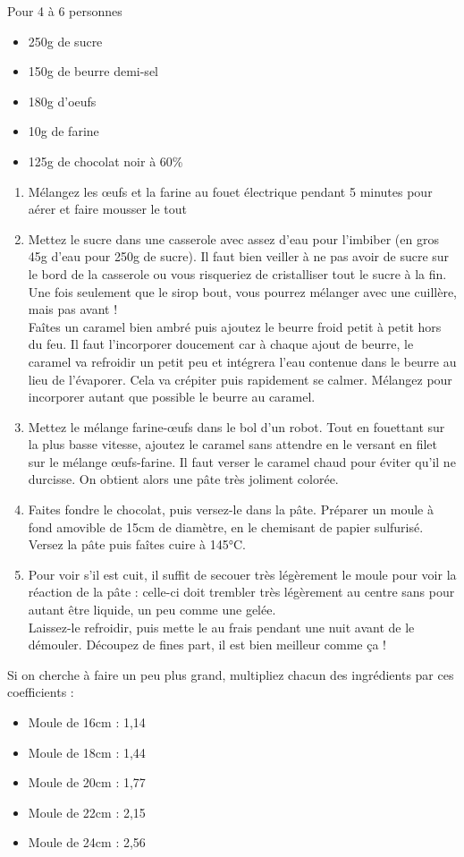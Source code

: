 {Pour 4 à 6 personnes}{\begin{itemize}
	\item 250g de sucre
	\item 150g de beurre demi-sel
	\item 180g d'oeufs
	\item 10g de farine
	\item 125g de chocolat noir à 60\%
\end{itemize}}
{\begin{enumerate}
\item Mélangez les \oe ufs et la farine au fouet électrique pendant 5 minutes pour aérer et faire mousser le tout
\item Mettez le sucre dans une casserole avec assez d'eau pour l'imbiber (en gros 45g d'eau pour 250g de sucre). Il faut bien veiller à ne pas avoir de sucre sur le bord de la casserole ou vous risqueriez de cristalliser tout le sucre à la fin. Une fois seulement que le sirop bout, vous pourrez mélanger avec une cuillère, mais pas avant !\\
Faîtes un caramel bien ambré puis ajoutez le beurre froid petit à petit hors du feu. Il faut l'incorporer doucement car à chaque ajout de beurre, le caramel va refroidir un petit peu et intégrera l'eau contenue dans le beurre au lieu de l'évaporer. Cela va crépiter puis rapidement se calmer. Mélangez pour incorporer autant que possible le beurre au caramel.
\item Mettez le mélange farine-\oe ufs dans le bol d'un robot. Tout en fouettant sur la plus basse vitesse, ajoutez le caramel sans attendre en le versant en filet sur le mélange \oe ufs-farine. Il faut verser le caramel chaud pour éviter qu'il ne durcisse. On obtient alors une pâte très joliment colorée.
\item Faites fondre le chocolat, puis versez-le dans la pâte. Préparer un moule à fond amovible de 15cm de diamètre, en le chemisant de papier sulfurisé. Versez la pâte puis faîtes cuire à 145°C.
\item Pour voir s'il est cuit, il suffit de secouer très légèrement le moule pour voir la réaction de la pâte : celle-ci doit trembler très légèrement au centre sans pour autant être liquide, un peu comme une gelée.\\
Laissez-le refroidir, puis mette le au frais pendant une nuit avant de le démouler. Découpez de fines part, il est bien meilleur comme ça !
\end{enumerate}

Si on cherche à faire un peu plus grand, multipliez chacun des ingrédients par ces coefficients :
\begin{itemize}
\item Moule de 16cm : 1,14
\item Moule de 18cm : 1,44
\item Moule de 20cm : 1,77
\item Moule de 22cm : 2,15
\item Moule de 24cm : 2,56
\end{itemize}}

